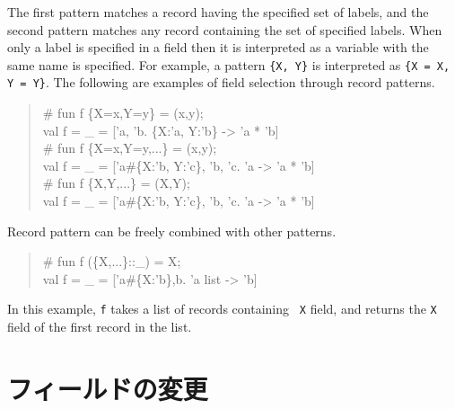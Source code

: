\documentclass{jbook}
\newcommand{\txt}[2]{#1}
\begin{document}
	The first pattern matches a record having the specified set of
labels, and the second pattern matches any record containing the set of
specified labels.
	When only a label is specified in a field then it
is interpreted as a variable with the same name is specified.
	For example, a pattern {\tt \{X, Y\}} is interpreted as 
{\tt \{X = X, Y = Y\}}.
	The following are examples of field selection through record patterns.
\begin{tt}\begin{quote}
\# fun f \{X=x,Y=y\} = (x,y);\\
val f = \_ = ['a, 'b. \{X:'a, Y:'b\} -> 'a * 'b]\\
\# fun f \{X=x,Y=y,...\} = (x,y);\\
val f = \_ = ['a\#\{X:'b, Y:'c\}, 'b, 'c. 'a -> 'a * 'b]\\
\# fun f \{X,Y,...\} = (X,Y);\\
val f = \_ = ['a\#\{X:'b, Y:'c\}, 'b, 'c. 'a -> 'a * 'b]
\end{quote}\end{tt}
	Record pattern can be freely combined with other patterns.
\begin{tt}\begin{quote}
\# fun f (\{X,...\}::\_) = X;\\
val f = \_ = ['a\#\{X:'b\},b. 'a list -> 'b]\\
\end{quote}\end{tt}
	In this example, {\tt f} takes a list of records containing {\tt
X} field, and returns the {\tt X} field of the first record in the list.
\fi%

\section{\txt{フィールドの変更}{Functional record update}}
\label{sec:extensionFieldupdate}
\end{document}
